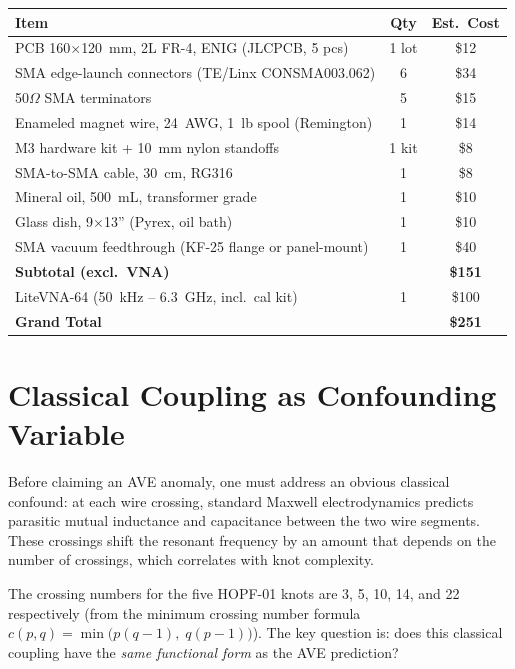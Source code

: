 \begin{center}
\begin{tabular}{|l|c|c|}
\hline
Item & Qty & Est.\ Cost \\ \hline
PCB 160$\times$120~mm, 2L FR-4, ENIG (JLCPCB, 5 pcs)           & 1 lot & \$12  \\
SMA edge-launch connectors (TE/Linx CONSMA003.062)              & 6     & \$34  \\
50$\Omega$ SMA terminators                                      & 5     & \$15  \\
Enameled magnet wire, 24~AWG, 1~lb spool (Remington)            & 1     & \$14  \\
M3 hardware kit + 10~mm nylon standoffs                         & 1 kit & \$8   \\
SMA-to-SMA cable, 30~cm, RG316                                  & 1     & \$8   \\
Mineral oil, 500~mL, transformer grade                          & 1     & \$10  \\
Glass dish, 9$\times$13'' (Pyrex, oil bath)                     & 1     & \$10  \\
SMA vacuum feedthrough (KF-25 flange or panel-mount)             & 1     & \$40  \\ \hline
\textbf{Subtotal (excl.\ VNA)}                                   &       & \textbf{\$151} \\ \hline
LiteVNA-64 (50~kHz -- 6.3~GHz, incl.\ cal kit)                  & 1     & \$100 \\ \hline
\textbf{Grand Total}                                             &       & \textbf{\$251} \\ \hline
\end{tabular}
\end{center}

\section{Classical Coupling as Confounding Variable}

Before claiming an AVE anomaly, one must address an obvious classical confound: at each wire crossing, standard Maxwell electrodynamics predicts parasitic mutual inductance and capacitance between the two wire segments. These crossings shift the resonant frequency by an amount that depends on the number of crossings, which correlates with knot complexity.

The crossing numbers for the five HOPF-01 knots are 3, 5, 10, 14, and 22 respectively (from the minimum crossing number formula $c(p,q) = \min\bigl(p(q{-}1),\; q(p{-}1)\bigr)$). The key question is: does this classical coupling have the \textit{same functional form} as the AVE prediction?

